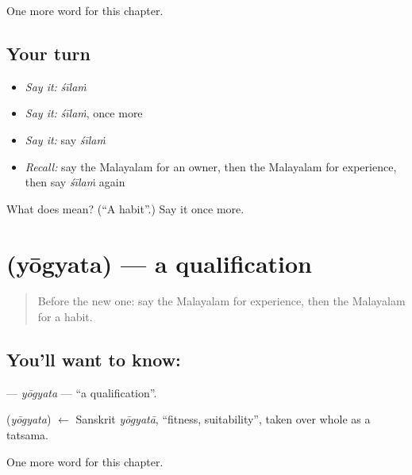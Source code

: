 \begin{grammarlens}[title={What you've built}]
One more word for this chapter.
\end{grammarlens}

\subsection*{Your turn}
\begin{itemize}
\raggedright
  \item \emph{Say it:} \emph{śīlaṁ}
  \item \emph{Say it:} \emph{śīlaṁ}, once more
  \item \emph{Say it:} say \emph{śīlaṁ}
  \item \emph{Recall:} say the Malayalam for an owner, then the Malayalam for experience, then say \emph{śīlaṁ} again
\end{itemize}

\begin{tcolorbox}[breakable,colback=teal!4,colframe=teal!35!black,title={Before you move on}]
What does  mean? (\textquotedblleft{}A habit\textquotedblright{}.) Say it once more.
\end{tcolorbox}
\section[\texorpdfstring{\ml{യോഗ്യത} (yōgyata)}{യോഗ്യത (yōgyata)}]{ (yōgyata) — a qualification}

\label{lesson:ML-C143-yogyata}



\begin{quote}
Before the new one: say the Malayalam for experience, then the Malayalam for a habit.
\end{quote}

\subsection*{You'll want to know: }
\textbf{} — \emph{yōgyata} — \textquotedblleft{}a qualification\textquotedblright{}.

\begin{cousinweb}
\textbf{} (\emph{yōgyata}) $\leftarrow$ Sanskrit \emph{yōgyatā}, \textquotedblleft{}fitness, suitability\textquotedblright{}, taken over whole as a tatsama.
\end{cousinweb}

\begin{grammarlens}[title={What you've built}]
One more word for this chapter.
\end{grammarlens}

